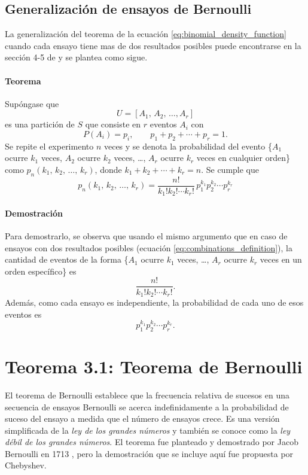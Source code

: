 \documentclass[a4paper]{report}
\begin{document}
\subsection{Generalización de ensayos de Bernoulli}

La generalización del teorema de la ecuación \ref{eq:binomial_density_function} cuando cada ensayo tiene mas de dos resultados posibles puede encontrarse en la sección 4-5 de \cite{papoulis2002probability} y se plantea como sigue. 

\paragraph{Teorema} Supóngase que 
\[
 U=[A_1,\,A_2,\,\dots,A_r]
\]
es una partición de \(S\) que consiste en \(r\) eventos \(A_i\) con
\[
 P(A_i)=p_i,\qquad p_1+p_2+\cdots+p_r=1.
\]
Se repite el experimento \(n\) veces y se denota la probabilidad del evento \{\(A_1\) ocurre \(k_1\) veces, \(A_2\) ocurre \(k_2\) veces, \ldots, \(A_r\) ocurre \(k_r\) veces en cualquier orden\} como \(p_n(k_1,\,k_2,\,\dots,\,k_r)\), donde \(k_1+k_2+\cdots+k_r=n\). Se cumple que
\begin{equation}\label{eq:bernoulli_trials_generalization}
 p_n(k_1,\,k_2,\,\dots,\,k_r)=\frac{n!}{k_1!k_2!\cdots k_r!}\,p_1^{k_1}p_2^{k_2}\cdots p_r^{k_r}
\end{equation}

\paragraph{Demostración} Para demostrarlo, se observa que usando el mismo argumento que en caso de ensayos con dos resultados posibles (ecuación \ref{eq:combinations_definition}), la cantidad de eventos de la forma \{\(A_1\) ocurre \(k_1\) veces, \ldots, \(A_r\) ocurre \(k_r\) veces en un orden específico\} es
\[
 \frac{n!}{k_1!k_2!\cdots k_r!}.
\]
Además, como cada ensayo es independiente, la probabilidad de cada uno de esos eventos es
\[
 p_1^{k_1}p_2^{k_2}\cdots p_r^{k_r}.
\]

\section{Teorema 3.1: Teorema de Bernoulli}\label{sec:bernoulli_theorem}

El teorema de Bernoulli establece que la frecuencia relativa de sucesos en una secuencia de ensayos Bernoulli se acerca indefinidamente a la probabilidad de suceso del ensayo a medida que el número de ensayos crece. Es una versión simplificada de la \emph{ley de los grandes números} y también se conoce como la \emph{ley débil de los grandes números}. El teorema fue planteado y demostrado por Jacob Bernoulli en 1713 \cite{papoulis2002probability}, pero la demostración que se incluye aquí fue propuesta por Chebyshev.
\end{document}
